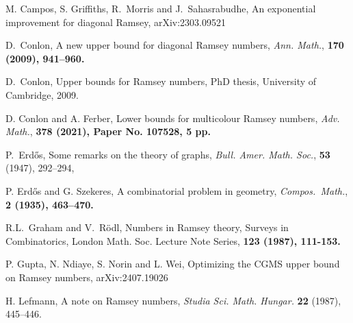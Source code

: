 \documentclass[12pt,reqno]{amsart}
\theoremstyle{definition}
\theoremstyle{remark}
\begin{document}
\begin{thebibliography}{9}



 M. Campos, S. Griffiths, R.~Morris and J.~Sahasrabudhe, 
An exponential improvement for diagonal Ramsey, arXiv:2303.09521

 D.~Conlon, 
A new upper bound for diagonal Ramsey numbers, 
\emph{Ann. Math.},  \bf 170 \rm (2009), 941--960.

 D.~Conlon, 
Upper bounds for Ramsey numbers, 
PhD thesis, University of Cambridge, 2009.


 D. Conlon and A. Ferber, 
Lower bounds for multicolour Ramsey numbers, 
\emph{Adv. Math.}, \bf 378 \rm (2021), Paper No. 107528, 5 pp.




 P.~Erd\H{o}s, 
Some remarks on the theory of graphs, 
\emph{Bull. Amer. Math. Soc.}, \textbf{53} (1947), 292--294,

 P. Erd\H{o}s and G. Szekeres, 
A combinatorial problem in geometry, 
\emph{Compos.~Math.}, \bf 2 \rm (1935), 463--470.

 R.L.~Graham and V.~R\"odl, 
Numbers in Ramsey theory, 
Surveys in Combinatorics, London Math. Soc. Lecture Note Series, \bf 123 \rm (1987), 111-153.

 P. Gupta, N. Ndiaye, S. Norin and L. Wei, Optimizing the CGMS upper bound on Ramsey numbers, arXiv:2407.19026

 H. Lefmann, A note on Ramsey numbers, 
\emph{Studia Sci. Math. Hungar.} \textbf{22} (1987), 445--446.


\end{thebibliography}
\end{document}
